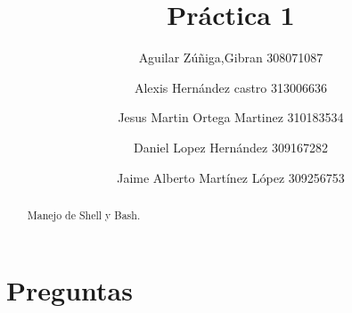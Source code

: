 \documentclass[a4paperx]{article}
\begin{document}
\title{Pr\'actica 1}
\author{
Aguilar Z\'u\~niga,Gibran 308071087 \and  Alexis Hernández castro 313006636 \and Jesus Martin Ortega Martinez 310183534 \and Daniel Lopez Hernández 309167282 \and Jaime Alberto Martínez López 309256753
}

\maketitle

\begin{abstract}
Manejo de Shell y Bash.
\end{abstract}

\section{Preguntas}
\end{document}
